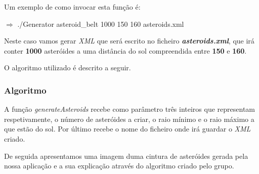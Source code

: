 \documentclass[a4paper]{article}
\begin{document}
Um exemplo de como invocar esta função é:

 \vspace{0.5cm}

$\Rightarrow$ ./Generator asteroid\_belt 1000 150 160 asteroids.xml

 \vspace{0.5cm}

 Neste caso vamos gerar \emph{XML} que será escrito no ficheiro \textbf{\emph{asteroids.xml}}, que irá conter \textbf{1000} asteróides a uma distância do sol compreendida entre \textbf{150} e \textbf{160}.

O algoritmo utilizado é descrito a seguir.

\subsubsection{Algoritmo}
A função \textit{generateAsteroids} recebe como parâmetro três inteiros que representam respetivamente, o número de asteróides a criar, o raio mínimo e o raio máximo a que estão do sol. Por último recebe o nome do ficheiro onde irá guardar o \emph{XML} criado.

De seguida apresentamos uma imagem duma cintura de asteróides gerada pela nossa aplicação e a sua explicação através do algoritmo criado pelo grupo.
\end{document}
